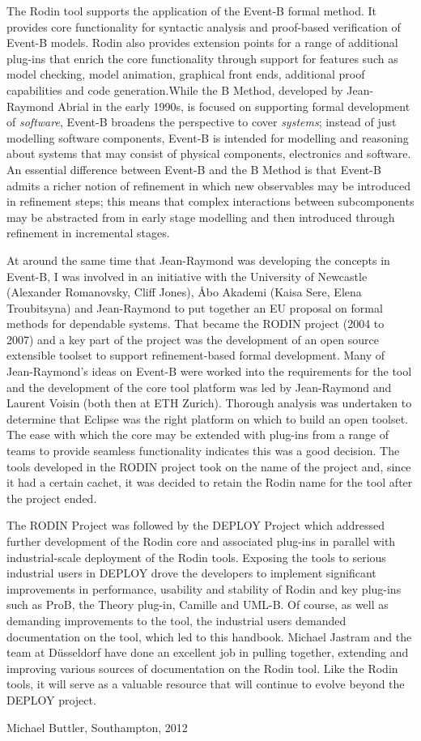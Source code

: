 The Rodin tool supports the application of the Event-B formal method.  It provides core functionality for syntactic analysis and proof-based verification of Event-B models. Rodin also provides extension points for a range of additional plug-ins that enrich the core functionality through support for features such as model checking, model animation, graphical front ends, additional proof capabilities and code generation.While the B Method, developed by Jean-Raymond Abrial in the early 1990s, is focused on supporting formal development of \textit{software}, Event-B broadens the perspective to cover \textit{systems}; instead of just modelling software components, Event-B is intended for modelling and reasoning about systems that may consist of physical components, electronics and software.  An essential difference between Event-B and the B Method is that Event-B admits a richer notion of refinement in which new observables may be introduced in refinement steps; this means that complex interactions between subcomponents may be abstracted from in early stage modelling and then introduced through refinement in incremental stages.  

At around the same time that Jean-Raymond was developing the concepts in Event-B, I was involved in an initiative with the University of Newcastle (Alexander Romanovsky, Cliff Jones), {\AA}bo Akademi  (Kaisa Sere, Elena Troubitsyna) and Jean-Raymond to put together an EU proposal on formal methods for dependable systems.  That became the RODIN project (2004 to 2007) and a key part of the project was the development of an open source extensible toolset to support refinement-based formal development.  Many of Jean-Raymond’s ideas on Event-B were worked into the requirements for the tool and the development of the core tool platform was led by Jean-Raymond and Laurent Voisin (both then at ETH Zurich). Thorough analysis was undertaken to determine that Eclipse was the right platform on which to build an open toolset.  The ease with which the core may be extended with plug-ins from a range of teams to provide seamless functionality indicates this was a good decision. The tools developed in the RODIN project took on the name of the project and, since it had a certain cachet, it was decided to retain the Rodin name for the tool after the project ended.

The RODIN Project was followed by the DEPLOY Project which addressed further development of the Rodin core and associated plug-ins in parallel with industrial-scale deployment of the Rodin tools.  Exposing the tools to serious industrial users in DEPLOY drove the developers to implement significant improvements in performance, usability and stability of Rodin and key plug-ins such as ProB, the Theory plug-in, Camille and UML-B.  Of course, as well as demanding improvements to the tool, the industrial users demanded documentation on the tool, which led to this handbook.  Michael Jastram and the team at D\"{u}sseldorf have done an excellent job in pulling together, extending and improving various sources of documentation on the Rodin tool.  Like the Rodin tools, it will serve as a valuable resource that will continue to evolve beyond the DEPLOY project.

\begin{flushright}Michael Buttler, Southampton, 2012\end{flushright}
